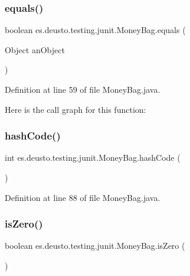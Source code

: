 \subsubsection{\texorpdfstring{equals()}{equals()}}
{\footnotesize\ttfamily boolean es.\+deusto.\+testing.\+junit.\+Money\+Bag.\+equals (\begin{DoxyParamCaption}\item[{Object}]{an\+Object }\end{DoxyParamCaption})}



Definition at line 59 of file Money\+Bag.\+java.

Here is the call graph for this function\+:
\mbox{\label{classes_1_1deusto_1_1testing_1_1junit_1_1_money_bag_ae2c0d290a37a617f0a07134bf95162eb}} 
\subsubsection{\texorpdfstring{hash\+Code()}{hashCode()}}
{\footnotesize\ttfamily int es.\+deusto.\+testing.\+junit.\+Money\+Bag.\+hash\+Code (\begin{DoxyParamCaption}{ }\end{DoxyParamCaption})}



Definition at line 88 of file Money\+Bag.\+java.

\mbox{\label{classes_1_1deusto_1_1testing_1_1junit_1_1_money_bag_abebc5bc39c3343cb3c4e5fb291fd5893}} 
\subsubsection{\texorpdfstring{is\+Zero()}{isZero()}}
{\footnotesize\ttfamily boolean es.\+deusto.\+testing.\+junit.\+Money\+Bag.\+is\+Zero (\begin{DoxyParamCaption}{ }\end{DoxyParamCaption})}

